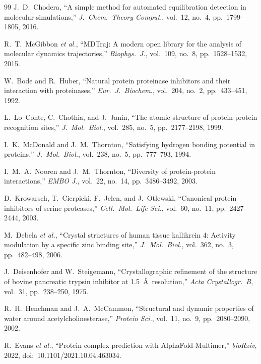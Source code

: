 \documentclass[conference]{IEEEtran}
\begin{document}
\begin{thebibliography}{99}
J.~D.~Chodera,
``A simple method for automated equilibration detection in molecular
simulations,''
\textit{J.\ Chem.\ Theory Comput.}, vol.~12, no.~4, pp.~1799--1805, 2016.

R.~T.~McGibbon \textit{et al.},
``MDTraj: A modern open library for the analysis of molecular dynamics
trajectories,''
\textit{Biophys.\ J.}, vol.~109, no.~8, pp.~1528--1532, 2015.


W.~Bode and R.~Huber,
``Natural protein proteinase inhibitors and their interaction with
proteinases,''
\textit{Eur.\ J.\ Biochem.}, vol.~204, no.~2, pp.~433--451, 1992.

L.~Lo~Conte, C.~Chothia, and J.~Janin,
``The atomic structure of protein-protein recognition sites,''
\textit{J.\ Mol.\ Biol.}, vol.~285, no.~5, pp.~2177--2198, 1999.

I.~K.~McDonald and J.~M.~Thornton,
``Satisfying hydrogen bonding potential in proteins,''
\textit{J.\ Mol.\ Biol.}, vol.~238, no.~5, pp.~777--793, 1994.

I.~M.~A.~Nooren and J.~M.~Thornton,
``Diversity of protein-protein interactions,''
\textit{EMBO J.}, vol.~22, no.~14, pp.~3486--3492, 2003.

D.~Krowarsch, T.~Cierpicki, F.~Jelen, and J.~Otlewski,
``Canonical protein inhibitors of serine proteases,''
\textit{Cell.\ Mol.\ Life Sci.}, vol.~60, no.~11, pp.~2427--2444, 2003.

M.~Debela \textit{et al.},
``Crystal structures of human tissue kallikrein 4: Activity modulation
by a specific zinc binding site,''
\textit{J.\ Mol.\ Biol.}, vol.~362, no.~3, pp.~482--498, 2006.

J.~Deisenhofer and W.~Steigemann,
``Crystallographic refinement of the structure of bovine pancreatic
trypsin inhibitor at 1.5~\AA\ resolution,''
\textit{Acta Crystallogr.\ B}, vol.~31, pp.~238--250, 1975.

R.~H.~Henchman and J.~A.~McCammon,
``Structural and dynamic properties of water around
acetylcholinesterase,''
\textit{Protein Sci.}, vol.~11, no.~9, pp.~2080--2090, 2002.

R.~Evans \textit{et al.},
``Protein complex prediction with AlphaFold-Multimer,''
\textit{bioRxiv}, 2022, doi:~10.1101/2021.10.04.463034.


\end{thebibliography}
\end{document}
